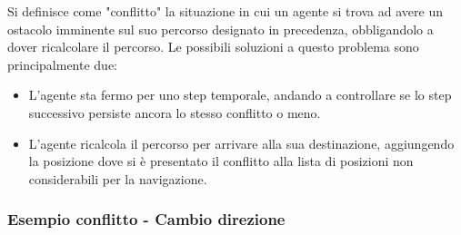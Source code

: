 \documentclass[12pt]{article}
\begin{document}
\noindent Si definisce come "conflitto" la situazione in cui un agente si trova ad avere un ostacolo imminente sul suo percorso designato in precedenza, obbligandolo a dover ricalcolare il percorso. Le possibili soluzioni a questo problema sono principalmente due:\\
\begin{itemize}
\item L'agente sta fermo per uno step temporale, andando a controllare se lo step successivo persiste ancora lo stesso conflitto o meno.
\item L'agente ricalcola il percorso per arrivare alla sua destinazione, aggiungendo la posizione dove si è presentato il conflitto alla lista di posizioni non considerabili per la navigazione.
\end{itemize}

\newpage

\subsubsection{Esempio conflitto - Cambio direzione}
\vspace{0.2cm}
\end{document}
